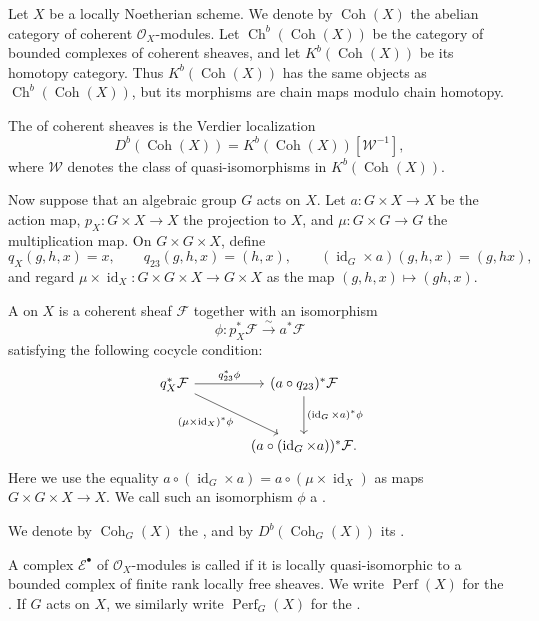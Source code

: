 {Let \(X\) be a locally Noetherian scheme.  We denote by
\(\operatorname{Coh}(X)\) the abelian category of coherent
\(\mathcal O_X\)-modules.  Let
\(\operatorname{Ch}^b(\operatorname{Coh}(X))\) be the category of
bounded complexes of coherent sheaves, and let
\(K^b(\operatorname{Coh}(X))\) be its homotopy category.  Thus
\(K^b(\operatorname{Coh}(X))\) has the same objects as
\(\operatorname{Ch}^b(\operatorname{Coh}(X))\), but its morphisms are
chain maps modulo chain homotopy.

The  of coherent sheaves is the Verdier
localization
\[
D^b(\operatorname{Coh}(X))
=
K^b(\operatorname{Coh}(X))[\mathcal W^{-1}],
\]
where \(\mathcal W\) denotes the class of quasi-isomorphisms in
\(K^b(\operatorname{Coh}(X))\).

Now suppose that an algebraic group \(G\) acts on \(X\).  Let
\(a:G\times X\to X\) be the action map, \(p_X:G\times X\to X\) the
projection to \(X\), and \(\mu:G\times G\to G\) the multiplication map.
On \(G\times G\times X\), define
\[
q_X(g,h,x)=x,\qquad
q_{23}(g,h,x)=(h,x),
\qquad
(\operatorname{id}_G\times a)(g,h,x)=(g,hx),
\]
and regard \(\mu\times \operatorname{id}_X:G\times G\times X\to G\times X\)
as the map \((g,h,x)\mapsto (gh,x)\).

A  on \(X\) is a coherent sheaf
\(\mathcal F\) together with an isomorphism
\[
\phi:p_X^*\mathcal F\xrightarrow{\sim}a^*\mathcal F
\]
satisfying the following cocycle condition:
\[
\begin{tikzcd}[column sep=large, row sep=large]
q_X^*\mathcal F
    \arrow[r, "q_{23}^*\phi"]
    \arrow[dr, "{(\mu\times \operatorname{id}_X)^*\phi}"']
&
(a\circ q_{23})^*\mathcal F
    \arrow[d, "{(\operatorname{id}_G\times a)^*\phi}"]
\\
&
(a\circ(\operatorname{id}_G\times a))^*\mathcal F .
\end{tikzcd}
\]
Here we use the equality
\(a\circ(\operatorname{id}_G\times a)=a\circ(\mu\times \operatorname{id}_X)\)
as maps \(G\times G\times X\to X\). We call such an isomorphism \(\phi\) a .

We denote by \(\operatorname{Coh}_G(X)\) the , and by
\(D^b(\operatorname{Coh}_G(X))\) its .

A complex \(\mathcal E^\bullet\) of \(\mathcal O_X\)-modules is called
 if it is locally quasi-isomorphic to a bounded complex
of finite rank locally free sheaves.  We write \(\operatorname{Perf}(X)\)
for the .  If \(G\)
acts on \(X\), we similarly write \(\operatorname{Perf}_G(X)\) for the
.

}
